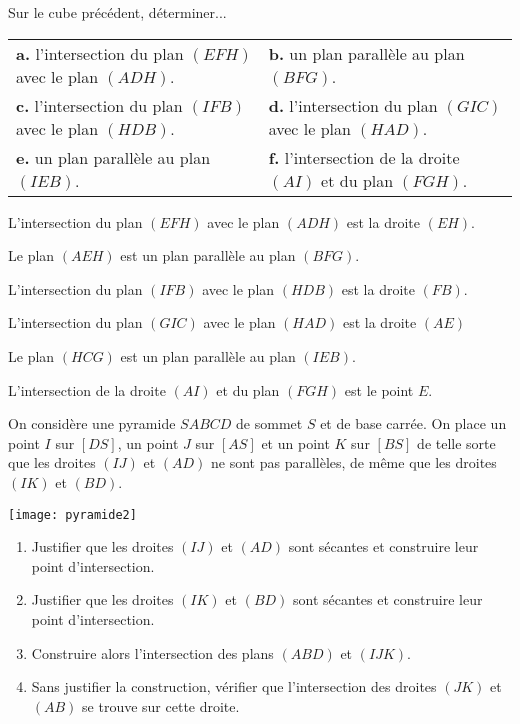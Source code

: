 \documentclass[11pt,fleqn, openany]{book} %
\begin{document}
\begin{exercise}[topic=geo02]Sur le cube précédent, déterminer...

\begin{tabularx}{\linewidth}{XX}
\textbf{a.} l'intersection du plan $(EFH)$ avec le plan $(ADH)$. &  \textbf{b.} un plan parallèle au plan $(BFG)$. \\
\textbf{c.} l'intersection du plan $(IFB)$ avec le plan $(HDB)$. & \textbf{d.} l'intersection du plan $(GIC)$ avec le plan $(HAD)$. \\
\textbf{e.} un plan parallèle au plan $(IEB)$. & \textbf{f.}  l'intersection de la droite $(AI)$ et du plan $(FGH)$.
\end{tabularx}\end{exercise}

\begin{solution}L'intersection du plan $(EFH)$ avec le plan $(ADH)$ est la droite $(EH)$.

Le plan $(AEH)$ est un plan parallèle au plan $(BFG)$.

L'intersection du plan $(IFB)$ avec le plan $(HDB)$ est la droite $(FB)$.

L'intersection du plan $(GIC)$ avec le plan $(HAD)$ est la droite $(AE)$

Le plan $(HCG)$ est un plan parallèle au plan $(IEB)$.

L'intersection de la droite $(AI)$ et du plan $(FGH)$ est le point $E$.

\end{solution}


\begin{exercise}[topic=geo02]\hspace{0pt}
  \begin{minipage}{0.5 \linewidth}
On considère une pyramide $SABCD$ de sommet $S$ et de base carrée. On place un point $I$ sur $[DS]$, un point $J$ sur $[AS]$ et un point $K$ sur $[BS]$ de telle sorte que les droites $(IJ)$ et $(AD)$ ne sont pas parallèles, de même que les droites $(IK)$ et $(BD)$.

\end{minipage}\hfill \begin{minipage}{0.4\linewidth}
\texttt{[image: pyramide2]}

\end{minipage}
\vskip30pt
\begin{enumerate}
\item Justifier que les droites $(IJ)$ et $(AD)$ sont sécantes et construire leur point d'intersection.
\item Justifier que les droites $(IK)$ et $(BD)$ sont sécantes et construire leur point d'intersection.
\item Construire alors l'intersection des plans $(ABD)$ et $(IJK)$.
\item Sans justifier la construction, vérifier que l'intersection des droites $(JK)$ et $(AB)$ se trouve sur cette droite.
\end{enumerate}
\end{exercise}
\end{document}
